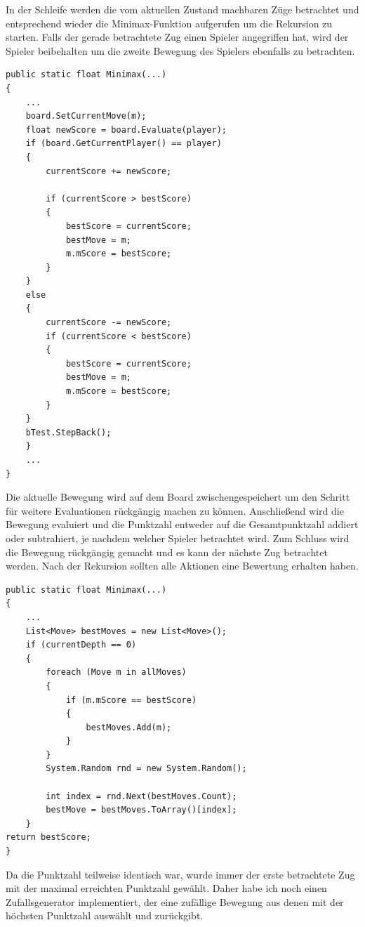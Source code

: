 In der Schleife werden die vom aktuellen Zustand machbaren Züge betrachtet und entsprechend wieder die Minimax-Funktion aufgerufen um die Rekursion zu starten. Falls der gerade betrachtete Zug einen Spieler angegriffen hat, wird der Spieler beibehalten um die zweite Bewegung des Spielers ebenfalls zu betrachten.\\

\begin{lstlisting}
public static float Minimax(...)
{
	...   
    board.SetCurrentMove(m);
	float newScore = board.Evaluate(player);
	if (board.GetCurrentPlayer() == player)
	{
		currentScore += newScore;
	
		if (currentScore > bestScore)
		{
			bestScore = currentScore;
			bestMove = m;
			m.mScore = bestScore;
		}
	}
	else
	{
		currentScore -= newScore;
		if (currentScore < bestScore)
		{
			bestScore = currentScore;
			bestMove = m;
			m.mScore = bestScore;
		}
	}
	bTest.StepBack();
	}
	...
}
\end{lstlisting}
Die aktuelle Bewegung wird auf dem Board zwischengespeichert um den Schritt für weitere Evaluationen rückgängig machen zu können. Anschließend wird die Bewegung evaluiert und die Punktzahl entweder auf die Gesamtpunktzahl addiert oder subtrahiert, je nachdem welcher Spieler betrachtet wird. Zum Schluss wird die Bewegung rückgängig gemacht und es kann der nächste Zug betrachtet werden. Nach der Rekursion sollten alle Aktionen eine Bewertung erhalten haben.\\

\begin{lstlisting}
public static float Minimax(...)
{
	...  
	List<Move> bestMoves = new List<Move>();
	if (currentDepth == 0)
	{
		foreach (Move m in allMoves)
		{
			if (m.mScore == bestScore)
			{
				bestMoves.Add(m);
			}
		}
		System.Random rnd = new System.Random();
		
		int index = rnd.Next(bestMoves.Count);
		bestMove = bestMoves.ToArray()[index];
	}
return bestScore;
}
\end{lstlisting}

Da die Punktzahl teilweise identisch war, wurde immer der erste betrachtete Zug mit der maximal erreichten Punktzahl gewählt. Daher habe ich noch einen Zufallsgenerator implementiert, der eine zufällige Bewegung aus denen mit der höchsten Punktzahl auswählt und zurückgibt.


